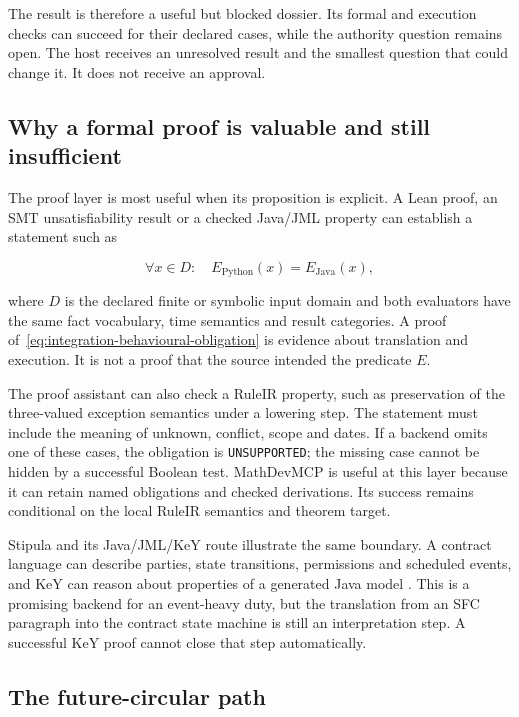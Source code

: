 The result is therefore a useful but blocked dossier. Its formal and execution
checks can succeed for their declared cases, while the authority
question remains open. The host receives an unresolved result and the smallest
question that could change it. It does not receive an approval.

\subsection{Why a formal proof is valuable and still insufficient}

The proof layer is most useful when its proposition is explicit. A Lean proof,
an SMT unsatisfiability result or a checked Java/JML property can establish a
statement such as

\begin{equation}
  \forall x\in D:\quad E_{\mathrm{Python}}(x)=E_{\mathrm{Java}}(x),
  \label{eq:integration-behavioural-obligation}
\end{equation}

where $D$ is the declared finite or symbolic input domain and both evaluators
have the same fact vocabulary, time semantics and result categories. A proof
of~\eqref{eq:integration-behavioural-obligation} is evidence about translation
and execution. It is not a proof that the source intended the predicate
$E$.

The proof assistant can also check a RuleIR property, such as preservation of
the three-valued exception semantics under a lowering step. The statement must
include the meaning of unknown, conflict, scope and dates. If a backend omits
one of these cases, the obligation is \texttt{UNSUPPORTED}; the missing case
cannot be hidden by a successful Boolean test. MathDevMCP is useful at this
layer because it can retain named obligations and checked derivations. Its
success remains conditional on the local RuleIR semantics and theorem target.

Stipula and its Java/JML/KeY route illustrate the same boundary. A contract
language can describe parties, state transitions, permissions and scheduled
events, and KeY can reason about properties of a generated Java model
\citep[secs.~3--6]{stipula2021}\citep[secs.~3--5]{stipulakey2025}. This is a
promising backend for an event-heavy duty, but the translation from an SFC
paragraph into the contract state machine is still an interpretation step. A
successful KeY proof cannot close that step automatically.

\subsection{The future-circular path}

